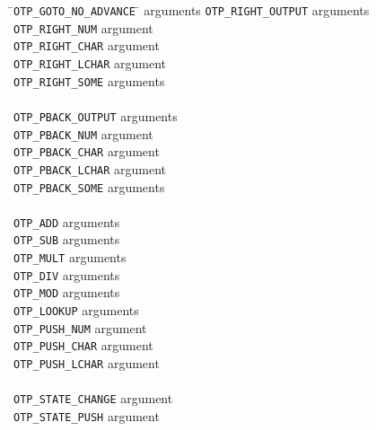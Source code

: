 \documentclass[fleqn]{article}
\begin{document}
\begin{tabbing}
 \= \quad \verb|OTP_GOTO_NO_ADVANCE| \=  arguments\kill
{} \> \quad \verb|OTP_RIGHT_OUTPUT| \>  arguments\\
 \> \quad \verb|OTP_RIGHT_NUM| \>  argument\\
 \> \quad \verb|OTP_RIGHT_CHAR| \>  argument\\
 \> \quad \verb|OTP_RIGHT_LCHAR| \>  argument\\
 \> \quad \verb|OTP_RIGHT_SOME| \>  arguments\\
\\
 \> \quad \verb|OTP_PBACK_OUTPUT| \>  arguments\\
 \> \quad \verb|OTP_PBACK_NUM| \>  argument\\
 \> \quad \verb|OTP_PBACK_CHAR| \>  argument\\
 \> \quad \verb|OTP_PBACK_LCHAR| \>  argument\\
 \> \quad \verb|OTP_PBACK_SOME| \>  arguments\\
\\
 \> \quad \verb|OTP_ADD| \>  arguments\\
 \> \quad \verb|OTP_SUB| \>  arguments\\
 \> \quad \verb|OTP_MULT| \>  arguments\\
 \> \quad \verb|OTP_DIV| \>  arguments\\
 \> \quad \verb|OTP_MOD| \>  arguments\\
 \> \quad \verb|OTP_LOOKUP| \>  arguments\\
 \> \quad \verb|OTP_PUSH_NUM| \>  argument\\
 \> \quad \verb|OTP_PUSH_CHAR| \>  argument\\
 \> \quad \verb|OTP_PUSH_LCHAR| \>  argument\\
\\
 \> \quad \verb|OTP_STATE_CHANGE| \>  argument\\
 \> \quad \verb|OTP_STATE_PUSH| \>  argument\\

\end{tabbing}
\end{document}
